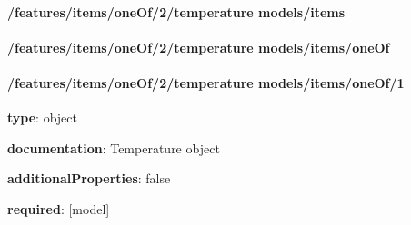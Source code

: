\begin{itemized}
\paragraph{/features/items/oneOf/2/temperature models/items} \begin{itemized}
\end{itemized}\end{itemized}\paragraph{/features/items/oneOf/2/temperature models/items/oneOf} \begin{itemized}
\end{itemized}\paragraph{/features/items/oneOf/2/temperature models/items/oneOf/1} \begin{itemized}
\item {\bf type}: object
\item {\bf documentation}: Temperature object
\item {\bf additionalProperties}: false
\item {\bf required}: [model]\end{itemized}
